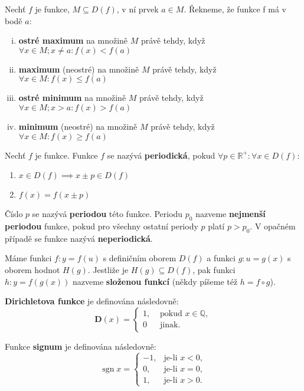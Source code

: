 \begin{definition}
  Nechť $f$ je funkce, $M \subseteq D(f)$, v ní prvek $a \in M$.
  Řekneme, že funkce f má v bodě $a$:
  \begin{enumerate}[i.]
    \item \textbf{ostré maximum} na množině $M$ právě tehdy, když $\forall x \in M; x \not = a: f(x) < f(a)$
    \item \textbf{maximum} (neostré) na množině $M$ právě tehdy, když $\forall x \in M : f(x) \leq f(a)$
    \item \textbf{ostré minimum} na množině $M$ právě tehdy, když $\forall x \in M; x > a: f(x) > f(a)$
    \item \textbf{minimum} (neostré) na množině $M$ právě tehdy, když $\forall x \in M : f(x) \geq f(a)$
  \end{enumerate}
\end{definition}

\begin{definition}
  Nechť $f$ je funkce. Funkce $f$ se nazývá \textbf{periodická}, pokud $\forall p \in \mathbb R^{+}: \forall x \in D(f):$
  \begin{enumerate}
    \item $x \in D(f) \implies x \pm p \in D(f)$
    \item $f(x) = f(x \pm p)$
  \end{enumerate}
  Číslo $p$ se nazývá \textbf{periodou} této funkce. Periodu $p_0$ nazveme \textbf{nejmenší periodou} funkce, pokud pro všechny ostatní periody $p$ platí $p > p_0$. V opačném případě se funkce nazývá \textbf{neperiodická}.
\end{definition}

\begin{definition}
  Máme funkci $f: y = f(u)$ s definičním oborem $D(f)$ a funkci $g: u=g(x)$ s oborem hodnot $H(g)$. Jestliže je $H(g) \subseteq D(f)$, pak funkci $h: y = f(g(x))$ nazveme \textbf{složenou funkcí} (někdy píšeme též $h=f \circ g$).
\end{definition}

\begin{definition}
  \textbf{Dirichletova funkce} je definována následovně:
  $$\mathbf{D} (x) = \begin{cases}
1, & \text{ pokud } x \in \mathbb Q, \\
0 & \text{ jinak}.
  \end{cases}  $$
\end{definition}

\begin{definition}
  Funkce \textbf{signum} je definována následovně: $$\operatorname {sgn} x={\begin{cases}-1,& \textrm{je-li }x<0,\\0,&\textrm{je-li }x=0,\\1,&\textrm{je-li }x>0.\end{cases}}$$
\end{definition}

